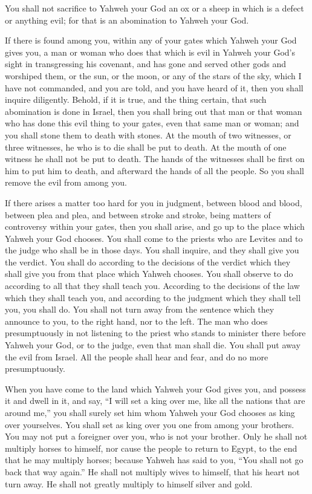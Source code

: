  You shall not sacrifice to Yahweh your God an ox or a sheep
in which is a defect or anything evil; for that is an abomination to
Yahweh your God.

 If there is found among you, within any of your gates which
Yahweh your God gives you, a man or woman who does that which is evil in
Yahweh your God's sight in transgressing his covenant,  and
has gone and served other gods and worshiped them, or the sun, or the
moon, or any of the stars of the sky, which I have not commanded,
 and you are told, and you have heard of it, then you shall
inquire diligently. Behold, if it is true, and the thing certain, that
such abomination is done in Israel,  then you shall bring
out that man or that woman who has done this evil thing to your gates,
even that same man or woman; and you shall stone them to death with
stones.  At the mouth of two witnesses, or three witnesses,
he who is to die shall be put to death. At the mouth of one witness he
shall not be put to death.  The hands of the witnesses shall
be first on him to put him to death, and afterward the hands of all the
people. So you shall remove the evil from among you.

 If there arises a matter too hard for you in judgment,
between blood and blood, between plea and plea, and between stroke and
stroke, being matters of controversy within your gates, then you shall
arise, and go up to the place which Yahweh your God chooses.
 You shall come to the priests who are Levites and to the
judge who shall be in those days. You shall inquire, and they shall give
you the verdict.  You shall do according to the decisions
of the verdict which they shall give you from that place which Yahweh
chooses. You shall observe to do according to all that they shall teach
you.  According to the decisions of the law which they
shall teach you, and according to the judgment which they shall tell
you, you shall do. You shall not turn away from the sentence which they
announce to you, to the right hand, nor to the left.  The
man who does presumptuously in not listening to the priest who stands to
minister there before Yahweh your God, or to the judge, even that man
shall die. You shall put away the evil from Israel.  All
the people shall hear and fear, and do no more presumptuously.

 When you have come to the land which Yahweh your God gives
you, and possess it and dwell in it, and say, ``I will set a king over
me, like all the nations that are around me,''  you shall
surely set him whom Yahweh your God chooses as king over yourselves. You
shall set as king over you one from among your brothers. You may not put
a foreigner over you, who is not your brother.  Only he
shall not multiply horses to himself, nor cause the people to return to
Egypt, to the end that he may multiply horses; because Yahweh has said
to you, ``You shall not go back that way again.''  He shall
not multiply wives to himself, that his heart not turn away. He shall
not greatly multiply to himself silver and gold.

